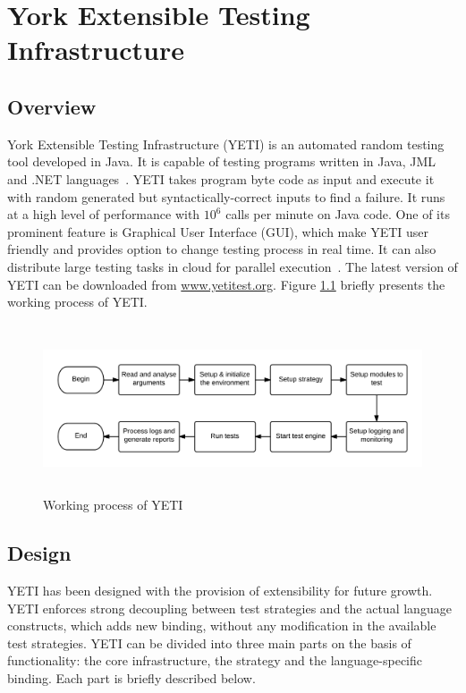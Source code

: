 
\chapter{York Extensible Testing Infrastructure}
\label{chap:yeti_3}




\section{Overview}
York Extensible Testing Infrastructure (YETI) is an automated random testing tool developed in Java. It is capable of testing programs written in Java, JML and .NET languages~\cite{oriol2010testing}. YETI takes program byte code as input and execute it with random generated but syntactically-correct inputs to find a failure. It runs at a high level of performance with $10^6$ calls per minute on Java code. One of its prominent feature is Graphical User Interface (GUI), which make YETI user friendly and provides option to change testing process in real time. It can also distribute large testing tasks in cloud for parallel execution~\cite{oriol2010yeti}. The latest version of YETI can be downloaded from \url{www.yetitest.org}. Figure \ref{fig:yetiOverview} briefly presents the working process of YETI. 
\bigskip
\begin{figure}[h]
	\centering
	\includegraphics[width=15.3cm, height=5cm]{chapter3/workingProcess.png}
	\bigskip
	\caption{Working process of YETI}
	\label{fig:yetiOverview}
\end{figure}


\section{Design}
YETI has been designed with the provision of extensibility for future growth. YETI enforces strong decoupling between test strategies and the actual language constructs, which adds new binding, without any modification in the available test strategies. YETI can be divided into three main parts on the basis of functionality: the core infrastructure, the strategy and the language-specific binding. Each part is briefly described below. 

